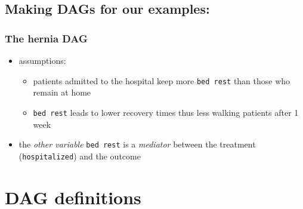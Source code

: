 \documentclass[
  letterpaper,
  DIV=11,
  numbers=noendperiod]{scrartcl}
\providecommand{\tightlist}{%
  \setlength{\itemsep}{0pt}\setlength{\parskip}{0pt}}\usepackage{longtable,booktabs,array}
\begin{document}
\subsection{Making DAGs for our
examples:}\label{making-dags-for-our-examples-1}

\subsubsection{The hernia DAG}\label{the-hernia-dag}

\begin{figure}


\caption{\label{fig-dag-hernia}}

\end{figure}%

\begin{itemize}
\tightlist
\item
  assumptions:

  \begin{itemize}
  \tightlist
  \item
    patients admitted to the hospital keep more \texttt{bed\ rest} than
    those who remain at home
  \item
    \texttt{bed\ rest} leads to lower recovery times thus less walking
    patients after 1 week
  \end{itemize}
\item
  the \emph{other variable} \texttt{bed\ rest} is a \emph{mediator}
  between the treatment (\texttt{hospitalized}) and the outcome
\end{itemize}

\section{DAG definitions}\label{dag-definitions}
\end{document}
